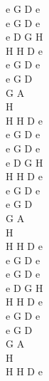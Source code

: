 \documentclass[a5paper, 10pt]{book}
\begin{document}
\begin{minipage}[t]{0.2\textwidth}
  e G D e\\
  e G D e\\
  e D G H\\
  H H D e\\
  e G D e\\
  e G D\\
  G A\\
  H\\
  H H D e\\

  e G D e\\
  e G D e\\
  e D G H\\
  H H D e\\
  e G D e\\
  e G D\\
  G A\\
  H\\
  H H D e\\

  e G D e\\
  e G D e\\
  e D G H\\
  H H D e\\
  e G D e\\
  e G D\\
  G A\\
  H\\
  H H D e\\
\end{minipage}

\newpage
\end{document}
